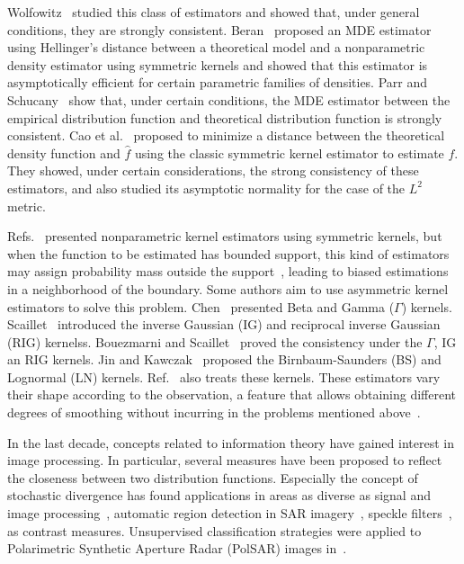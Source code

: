 \documentclass[twocolumn]{svjour3}
\begin{document}
Wolfowitz~\cite{wolfowitz1953, wolfowitz1957} studied this class of estimators and showed that, under general conditions, they are strongly consistent. 
Beran~\cite{beran1977} proposed an MDE estimator using Hellinger's distance between a theoretical model and a nonparametric density estimator using symmetric kernels and showed that this estimator is asymptotically efficient for certain parametric families of densities. 
Parr and Schucany~\cite{parr1982} show that, under certain conditions, the MDE estimator between the empirical distribution function and theoretical distribution function is strongly consistent. 
Cao et al.~\cite{cao1995minimum} proposed to minimize a distance between the theoretical density function and $\widehat{f}$ using the classic symmetric kernel estimator to estimate $f$. 
They showed, under certain considerations, the strong consistency of these estimators, and also studied its asymptotic normality for the case of the $L^2$ metric.

Refs.~\cite{Parzen62,Roseanblatt56} presented nonparametric kernel estimators using symmetric kernels, but when the function to be estimated has bounded support, this kind of estimators may assign probability mass outside the support~\cite{Silverman1986}, leading to biased estimations in a neighborhood of the boundary.
Some authors aim to use asymmetric kernel estimators to solve this problem. 
Chen~\cite{chen1999,chensx2000} presented Beta and Gamma ($\Gamma$) kernels.
Scaillet~\cite{Scaillet2004} introduced the inverse Gaussian (IG) and reciprocal inverse Gaussian (RIG) kernelss.
Bouezmarni and Scaillet~\cite{bouezmarni2005} proved the consistency under the $\Gamma$, IG an RIG kernels. 
Jin and Kawczak~\cite{Jin2003} proposed the Birnbaum-Saunders (BS) and Lognormal (LN) kernels. 
Ref.~\cite{libengue2013} also treats these kernels. 
These estimators vary their shape according to the observation, a feature that allows obtaining different degrees of smoothing without incurring in the problems mentioned above~\cite{Scaillet2004}.

In the last decade, concepts related to information theory have gained interest in image processing. 
In particular, several measures have been proposed to reflect the closeness between two distribution functions. 
Especially the concept of stochastic divergence has found applications in areas as diverse as signal and image processing~\cite{Aviyente2007}, automatic region detection in SAR imagery~\cite{SilvaCribariFrery:ImprovedLikelihood:Environmetrics,Nascimento2009}, 
speckle filters~\cite{Penna2019}, as contrast measures. 
Unsupervised classification strategies were applied to Polarimetric Synthetic Aperture Radar (PolSAR) images in~\cite{Carvalho2019}.
\end{document}
